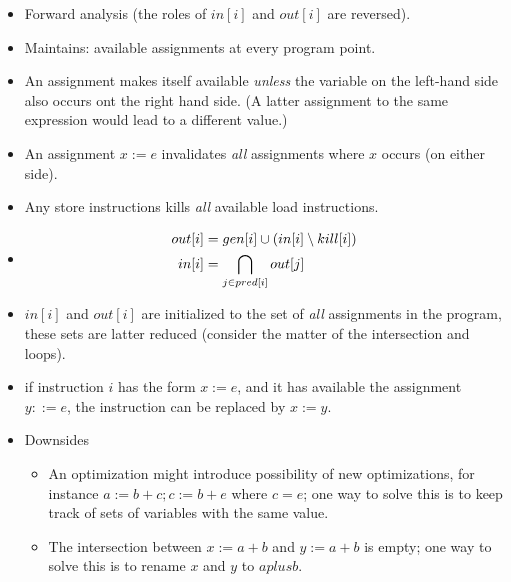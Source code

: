 \begin{itemize}

\item Forward analysis (the roles of $in[i]$ and $out[i]$ are reversed).

\item Maintains: available assignments at every program point.

\item An assignment makes itself available \emph{unless} the variable on the
left-hand side also occurs ont the right hand side. (A latter assignment to the
same expression would lead to a different value.)

\item An assignment $x:=e$ invalidates \emph{all} assignments where $x$ occurs
(on either side).

\item Any store instructions kills \emph{all} available load instructions.

\item

\begin{align}
out[i] &= gen[i] \cup \left({ in[i] \setminus kill[i] }\right) \\
in[i] &= \bigcap_{j\in pred[i]} out[j]
\end{align}

\item $in[i]$ and $out[i]$ are initialized to the set of \emph{all} assignments
in the program, these sets are latter reduced (consider the matter of the
intersection and loops).

\item if instruction $i$ has the form $x:=e$, and it has available the
assignment $y::=e$, the instruction can be replaced by $x:=y$.

\item Downsides

\begin{itemize}

\item An optimization might introduce possibility of new optimizations, for
instance $a:=b+c;c:=b+e$ where $c=e$; one way to solve this is to keep track of
sets of variables with the same value.

\item The intersection between $x:=a+b$ and $y:=a+b$ is empty; one way to solve
this is to rename $x$ and $y$ to $aplusb$.

\end{itemize}

\end{itemize}


